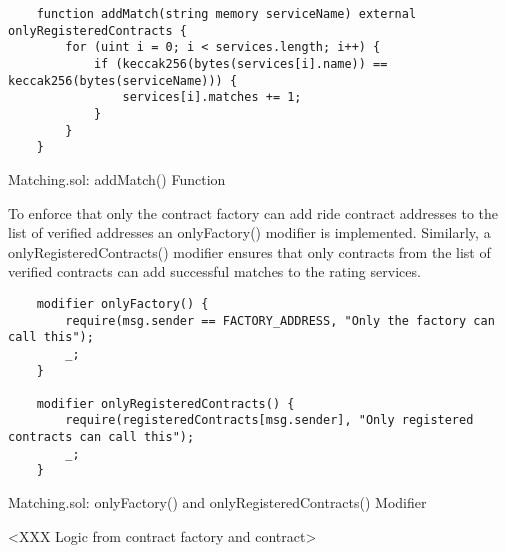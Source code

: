 \lstset{
  basicstyle=\footnotesize\ttfamily,
  breaklines=true,
  numbers=left,
  firstnumber=81
}

\begin{Listing}
\begin{lstlisting}
    function addMatch(string memory serviceName) external onlyRegisteredContracts {
        for (uint i = 0; i < services.length; i++) {
            if (keccak256(bytes(services[i].name)) == keccak256(bytes(serviceName))) {
                services[i].matches += 1;
            }
        }
    }
\end{lstlisting}
  \caption{Matching.sol: addMatch() Function}
  \label{lst:addMatch}
\end{Listing}

To enforce that only the contract factory can add ride contract addresses to the list of verified addresses an onlyFactory() modifier is implemented. Similarly, a onlyRegisteredContracts() modifier ensures that only contracts from the list of verified contracts can add successful matches to the rating services.

\lstset{
  basicstyle=\footnotesize\ttfamily,
  breaklines=true,
  numbers=left,
  firstnumber=24
}

\begin{Listing}
\begin{lstlisting}
    modifier onlyFactory() {
        require(msg.sender == FACTORY_ADDRESS, "Only the factory can call this");
        _;
    }

    modifier onlyRegisteredContracts() {
        require(registeredContracts[msg.sender], "Only registered contracts can call this");
        _;
    }
\end{lstlisting}
  \caption{Matching.sol: onlyFactory() and onlyRegisteredContracts() Modifier}
  \label{lst:modifier}
\end{Listing}


<XXX Logic from contract factory and contract>




